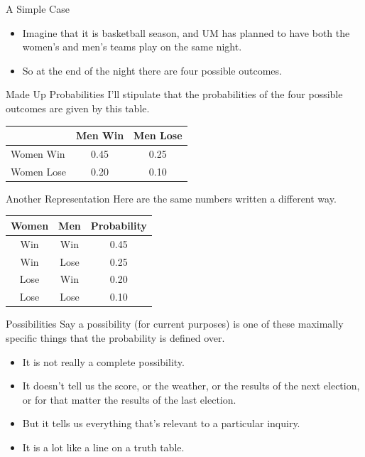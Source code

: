 \documentclass[
  ignorenonframetext,
]{beamer}
\providecommand{\tightlist}{%
  \setlength{\itemsep}{0pt}\setlength{\parskip}{0pt}}
\begin{document}
\begin{frame}{A Simple Case}
\protect\hypertarget{a-simple-case}{}
\begin{itemize}
\tightlist
\item
  Imagine that it is basketball season, and UM has planned to have both
  the women's and men's teams play on the same night.
\item
  So at the end of the night there are four possible outcomes.
\end{itemize}
\end{frame}

\begin{frame}{Made Up Probabilities}
\protect\hypertarget{made-up-probabilities}{}
I'll stipulate that the probabilities of the four possible outcomes are
given by this table.

\begin{longtable}[]{@{}lcc@{}}
\toprule
& Men Win & Men Lose \\
\midrule
\endhead
Women Win & 0.45 & 0.25 \\
Women Lose & 0.20 & 0.10 \\
\bottomrule
\end{longtable}
\end{frame}

\begin{frame}{Another Representation}
\protect\hypertarget{another-representation}{}
Here are the same numbers written a different way.

\begin{longtable}[]{@{}ccc@{}}
\toprule
Women & Men & Probability \\
\midrule
\endhead
Win & Win & 0.45 \\
Win & Lose & 0.25 \\
Lose & Win & 0.20 \\
Lose & Lose & 0.10 \\
\bottomrule
\end{longtable}
\end{frame}

\begin{frame}{Possibilities}
\protect\hypertarget{possibilities}{}
Say a possibility (for current purposes) is one of these maximally
specific things that the probability is defined over.

\begin{itemize}
\tightlist
\item
  It is not really a complete possibility.
\item
  It doesn't tell us the score, or the weather, or the results of the
  next election, or for that matter the results of the last election.
\item
  But it tells us everything that's relevant to a particular inquiry.
\item
  It is a lot like a line on a truth table.
\end{itemize}
\end{frame}
\end{document}
